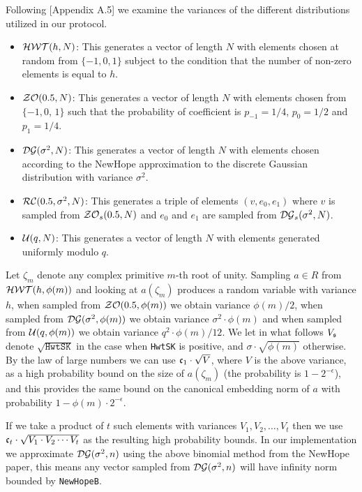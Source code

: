 Following \cite{GHS12c}[Appendix A.5] we examine the variances
of the different distributions utilized in our protocol.
\begin{itemize}
  \item $\mathcal{HWT}(h,N)$: This generates a vector of length $N$
        with elements chosen at random from $\{-1,0,1\}$ subject to
        the condition that the number of non-zero elements is equal to $h$.
  \item $\mathcal{ZO}(0.5,N)$:  This generates a vector of length $N$
        with elements chosen from $\{-1,0$, $1\}$ such that the
        probability of coefficient is $p_{-1}=1/4$, $p_0=1/2$
        and $p_1=1/4$.
  \item $\mathcal{DG}(\sigma^2,N)$: This generates a vector of
        length $N$ with elements chosen according to the NewHope
        approximation to the discrete Gaussian distribution with variance $\sigma^2$.
  \item $\mathcal{RC}(0.5,\sigma^2,N)$: This generates a triple of
        elements $(v,e_0,e_1)$ where $v$ is sampled from $\mathcal{ZO}_s(0.5,N)$
        and $e_0$ and $e_1$ are sampled from $\mathcal{DG}_s(\sigma^2,N)$.
  \item $\mathcal{U}(q,N)$: This generates a vector of length $N$
        with elements generated uniformly modulo $q$.
\end{itemize}
Let $\zeta_m$ denote any complex primitive $m$-th root of unity.
Sampling $a \in R$ from $\mathcal{HWT}(h,\phi(m))$ and looking at $a(\zeta_m)$
produces a random variable with variance $h$, when sampled
from $\mathcal{ZO}(0.5,\phi(m))$ we obtain variance $\phi(m)/2$,
when sampled from $\mathcal{DG}(\sigma^2,\phi(m))$ we obtain variance
$\sigma^2 \cdot \phi(m)$ and when sampled from $\mathcal{U}(q,\phi(m))$
we obtain variance $q^2 \cdot \phi(m)/12$.
We let in what follows $V_{\mathfrak{s}}$ denote $\sqrt{\texttt{HwtSK}}$ in the case
when \verb|HwtSK| is positive, and $\sigma \cdot \sqrt{\phi(m)}$ otherwise.
By the law of large numbers we can use $\mathfrak{c}_1 \cdot \sqrt{V}$,
where $V$ is the above variance, as a high probability bound
on the size of $a(\zeta_m)$ (the probability is $1-2^{-\epsilon}$),
and this provides the same bound on the canonical embedding norm of $a$
with probability $1- \phi(m) \cdot 2^{-\epsilon}$.

If we take a product of $t$ such
elements with variances $V_1, V_2, \ldots, V_t$
then we use $\mathfrak{c}_t \cdot \sqrt{V_1 \cdot V_2 \cdots V_t}$
as the resulting high probability bounds.
In our implementation we approximate $\mathcal{DG}(\sigma^2,n)$ using
the above binomial method from the NewHope paper, this means
any vector sampled from $\mathcal{DG}(\sigma^2,n)$ will have
infinity norm bounded by \verb+NewHopeB+.


